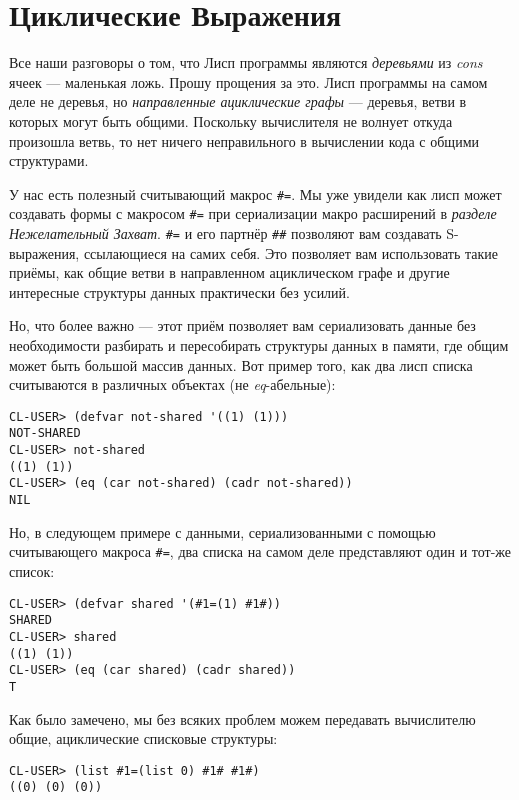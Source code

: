 \section{Циклические Выражения}\label{section_cyclic_expressions}

Все наши разговоры о том, что Лисп программы являются \emph{деревьями} из \emph{cons} ячеек --- маленькая ложь. Прошу прощения за это. Лисп программы на самом деле не деревья, но \emph{направленные ациклические графы} --- деревья, ветви в которых могут быть общими. Поскольку вычислителя не волнует откуда произошла ветвь, то нет ничего неправильного в вычислении кода с общими структурами.

У нас есть полезный считывающий макрос \verb"#=". Мы уже увидели как лисп может создавать формы с макросом \verb"#=" при сериализации макро расширений в \emph{разделе Нежелательный Захват}. \verb"#=" и его партнёр \verb"##" позволяют вам создавать S-выражения, ссылающиеся на самих себя. Это позволяет вам использовать такие приёмы, как общие ветви в направленном ациклическом графе и другие интересные структуры данных практически без усилий.

Но, что более важно --- этот приём позволяет вам сериализовать данные без необходимости разбирать и пересобирать структуры данных в памяти, где общим может быть большой массив данных. Вот пример того, как два лисп списка считываются в различных объектах (не \emph{eq}-а\-бель\-ные):

\begin{verbatim}
CL-USER> (defvar not-shared '((1) (1)))
NOT-SHARED
CL-USER> not-shared
((1) (1))
CL-USER> (eq (car not-shared) (cadr not-shared))
NIL
\end{verbatim}

Но, в следующем примере с данными, сериализованными с помощью считывающего макроса \verb"#=", два списка на самом деле представляют один и тот-же список:

\begin{verbatim}
CL-USER> (defvar shared '(#1=(1) #1#))
SHARED
CL-USER> shared
((1) (1))
CL-USER> (eq (car shared) (cadr shared))
T
\end{verbatim}

Как было замечено, мы без всяких проблем можем передавать вычислителю общие, ациклические списковые структуры:

\begin{verbatim}
CL-USER> (list #1=(list 0) #1# #1#)
((0) (0) (0))
\end{verbatim}

